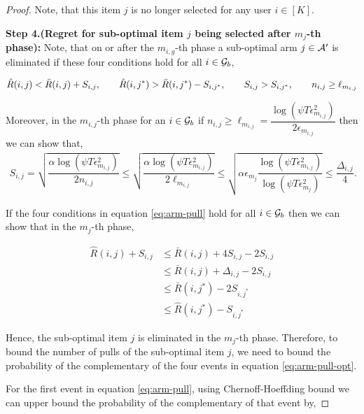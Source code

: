 \begin{proof}
Note, that this item $j$ is no longer selected for any user $i\in[K]$.

\textbf{Step 4.(Regret for sub-optimal item $j$ being selected after $m_{j}$-th phase):} Note, that on or after the $m_{i,g}$-th phase a sub-optimal arm $j\in\mathcal{A}'$ is eliminated if these four conditions hold for all $i\in\mathcal{G}_b$,

\begin{eqnarray}
\hat{R}(i,j) < \bar{R}(i,j) + S_{i,j}, \hspace*{2em}  \hat{R}(i,j^*) > \bar{R}(i,j^*) - S_{i,j^*}, \hspace*{2em} S_{i,j} > S_{i,j^*}, \hspace*{2em} n_{i,j} \geq \ell_{m_{i,j}} \label{eq:arm-pull}
\end{eqnarray}

Moreover, in the $m_{i,j}$-th phase for an $i\in\mathcal{G}_b$ if $n_{i,j} \geq \ell_{m_{i,j}} = \dfrac{\log(\psi T\epsilon_{m_{i,j}}^2)}{2\epsilon_{m_{i,j}}}$ then we can show that,
\begin{align*}
S_{i,j} = \sqrt{\dfrac{\alpha\log(\psi T\epsilon_{m_{i,j}}^2)}{2n_{i,j}}} \leq \sqrt{\dfrac{\alpha\log(\psi T\epsilon_{m_{i,j}}^2)}{2\ell_{m_{i,j}}}} \leq \sqrt{\alpha\epsilon_{m_{j}}\dfrac{\log(\psi T\epsilon_{m_{i,j}}^2)}{\log(\psi T\epsilon_{m_{j}}^2)}} \leq \dfrac{\Delta_{i,j}}{4}.
\end{align*}

If the four conditions in equation \ref{eq:arm-pull} hold for all $i\in\mathcal{G}_b$ then we can show that in the $m_{j}$-th phase,

\begin{align*}
\hat{R}(i,j) + S_{i,j} &\leq \bar{R}(i,j) + 4S_{i,j} - 2S_{i,j} \\
&\leq \bar{R}(i,j) + \Delta_{i,j} - 2S_{i,j}\\
& \leq \bar{R}(i,j^*) - 2S_{i,j^*} \\
&\leq \hat{R}(i,j^*) - S_{i , j^*}
\end{align*}

Hence, the sub-optimal item $j$ is eliminated in the $m_{j}$-th phase. Therefore, to bound the number of pulls of the sub-optimal item $j$, we need to bound the probability of the complementary of the four events in equation \ref{eq:arm-pull-opt}.

For the first event in equation \ref{eq:arm-pull}, using Chernoff-Hoeffding bound we can upper bound the probability of the complementary of that event by,


\end{proof}
